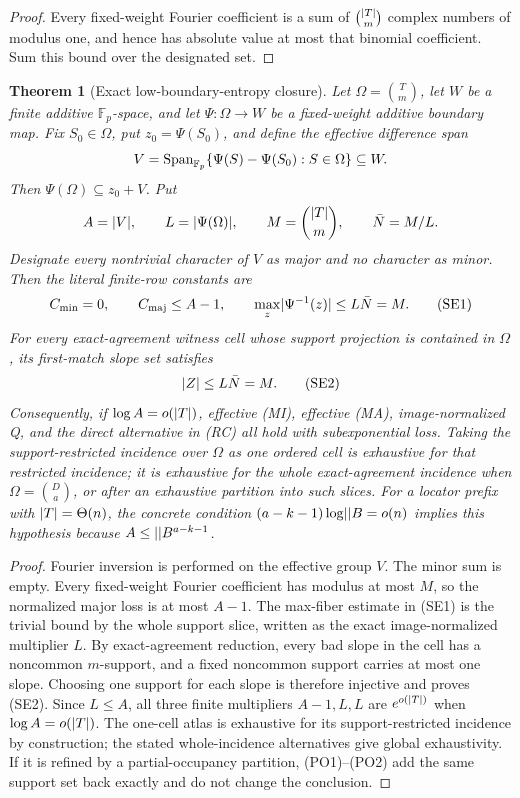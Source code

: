\documentclass[11pt,a4paper]{amsart}
\numberwithin{equation}{section}
\newtheorem{theorem}{Theorem}[section]
\theoremstyle{remark}
\newcommand{\F}{\mathbb F}\newcommand{\B}{\mathbb B}\newcommand{\K}{\mathbb K}\newcommand{\Z}{\mathbb Z}
\begin{document}
\begin{proof}
Every fixed-weight Fourier coefficient is a sum of \(\binom{\lvert T\rvert}m\)
complex numbers of modulus one, and hence has absolute value at most that
binomial coefficient.  Sum this bound over the designated set.
\end{proof}

\begin{theorem}[Exact low-boundary-entropy closure]
\label{thm:small-effective-dual-closure}
Let \(\Omega=\binom Tm\), let \(W\) be a finite additive
\(\F_p\)-space, and let \(\Psi:\Omega\to W\) be a fixed-weight additive
boundary map.  Fix \(S_0\in\Omega\), put \(z_0=\Psi(S_0)\), and define
the effective difference span
\[
 V=\Span_{\F_p}\{\Psi(S)-\Psi(S_0):S\in\Omega\}\subseteq W.
\]
Then \(\Psi(\Omega)\subseteq z_0+V\).  Put
\[
       A=\lvert V\rvert,\qquad L=\lvert \Psi(\Omega)\rvert,
       \qquad M=\binom{\lvert T\rvert}m,\qquad \bar N=M/L.
\]
Designate every nontrivial character of \(V\) as major and no character
as minor.  Then the literal finite-row constants are
\[
 C_{\rm min}=0,\qquad C_{\rm maj}\le A-1,\qquad
 \max_z\lvert \Psi^{-1}(z)\rvert\le L\bar N=M.            \tag{SE1}
\]
For every exact-agreement witness cell whose support projection is
contained in \(\Omega\), its first-match slope set satisfies
\[
                         \lvert Z\rvert\le L\bar N=M.       \tag{SE2}
\]
Consequently, if \(\log A=o(\lvert T\rvert)\), effective \textup{(MI)},
effective \textup{(MA)}, image-normalized Q, and the direct alternative
in \textup{(RC)} all hold with subexponential loss.  Taking the
support-restricted incidence over \(\Omega\) as one ordered cell is
exhaustive for that restricted incidence; it is exhaustive for the whole
exact-agreement incidence when \(\Omega=\binom Da\), or after an
exhaustive partition into such slices.  For a locator prefix with
\(\lvert T\rvert=\Theta(n)\), the concrete condition
\((a-k-1)\log\abs\B=o(n)\) implies this hypothesis because
\(A\le\abs\B^{a-k-1}\).
\end{theorem}

\begin{proof}
Fourier inversion is performed on the effective group \(V\).  The minor
sum is empty.  Every fixed-weight Fourier coefficient has
modulus at most \(M\), so the normalized major loss is at most \(A-1\).
The max-fiber estimate in \textup{(SE1)} is the trivial bound by the whole
support slice, written as the exact image-normalized multiplier \(L\).
By exact-agreement reduction, every bad slope in the cell has a noncommon
\(m\)-support, and a fixed noncommon support carries at most one slope.
Choosing one support for each slope is therefore injective and proves
\textup{(SE2)}.  Since \(L\le A\), all three finite multipliers
\(A-1,L,L\) are \(e^{o(\lvert T\rvert)}\) when \(\log A=o(\lvert T\rvert)\).
The one-cell atlas is exhaustive for its support-restricted incidence by
construction; the stated whole-incidence alternatives give global
exhaustivity.  If it is refined by a partial-occupancy partition,
\textup{(PO1)}--\textup{(PO2)} add the same support set back exactly and
do not change the conclusion.
\end{proof}
\end{document}
